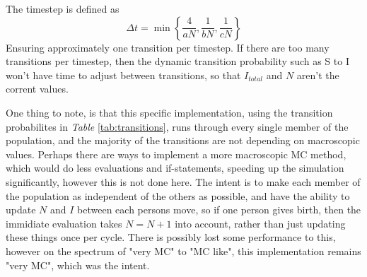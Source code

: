 The timestep is defined as 
$$
\Delta t=\min \left\{\frac{4}{a N}, \frac{1}{b N}, \frac{1}{c N}\right\}
$$
Ensuring approximately one transition per timestep. 
If there are too many transitions per timestep, then the dynamic transition probability such as S to I won't have time to adjust between transitions, so that $I_{total}$ and $N$ aren't the corrent values.

One thing to note, is that this specific implementation, using the transition probabilites in \textit{Table} \ref{tab:transitions}, runs through every single member of the population, and the majority of the transitions are not depending on macroscopic values.
Perhaps there are ways to implement a more macroscopic MC method, which would do less evaluations and if-statements, speeding up the simulation significantly, however this is not done here.
The intent is to make each member of the population as independent of the others as possible, and have the ability to update $N$ and $I$ between each persons move, so if one person gives birth, then the immidiate evaluation takes $N=N+1$ into account, rather than just updating these things once per cycle.
There is possibly lost some performance to this, however on the spectrum of "very MC" to "MC like", this implementation remains "very MC", which was the intent.

